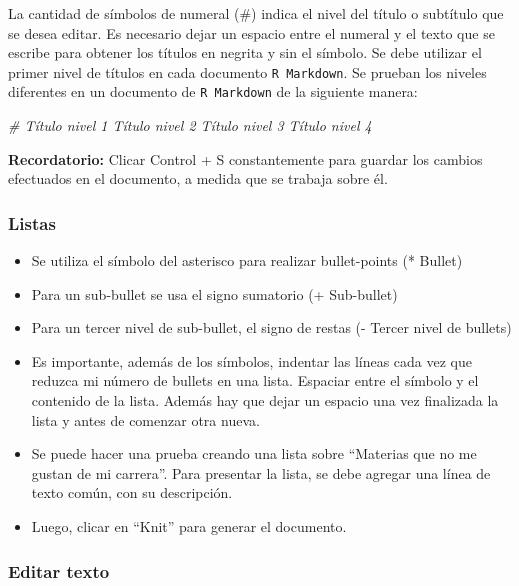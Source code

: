 \documentclass[
]{article}
\newenvironment{Shaded}{\begin{snugshade}}{\end{snugshade}}
\newcommand{\CommentTok}[1]{\textcolor[rgb]{0.56,0.35,0.01}{\textit{#1}}}
\begin{document}
La cantidad de símbolos de numeral (\#) indica el nivel del título o subtítulo que se desea editar. Es necesario dejar un espacio entre el numeral y el texto que se escribe para obtener los títulos en negrita y sin el símbolo. Se debe utilizar el primer nivel de títulos en cada documento \texttt{R\ Markdown}. Se prueban los niveles diferentes en un documento de \texttt{R\ Markdown} de la siguiente manera:

\begin{Shaded}
\begin{Highlighting}[]
\CommentTok{\# Título nivel 1 Título nivel 2 Título nivel 3 Título nivel 4}
\end{Highlighting}
\end{Shaded}

\textbf{Recordatorio: } Clicar Control + S constantemente para guardar los cambios efectuados en el documento, a medida que se trabaja sobre él.

\hypertarget{listas}{%
\subsubsection{Listas}\label{listas}}

\begin{itemize}
\item
  Se utiliza el símbolo del asterisco para realizar bullet-points (* Bullet)
\item
  Para un sub-bullet se usa el signo sumatorio (+ Sub-bullet)
\item
  Para un tercer nivel de sub-bullet, el signo de restas (- Tercer nivel de bullets)
\item
  Es importante, además de los símbolos, indentar las líneas cada vez que reduzca mi número de bullets
  en una lista. Espaciar entre el símbolo y el contenido de la lista. Además hay que dejar un espacio una vez finalizada la lista y antes de comenzar otra nueva.
\item
  Se puede hacer una prueba creando una lista sobre ``Materias que no me gustan de mi carrera''. Para presentar la lista, se debe agregar una línea de texto común, con su descripción.
\item
  Luego, clicar en ``Knit'' para generar el documento.
\end{itemize}

\hypertarget{editar-texto}{%
\subsubsection{Editar texto}\label{editar-texto}}
\end{document}
